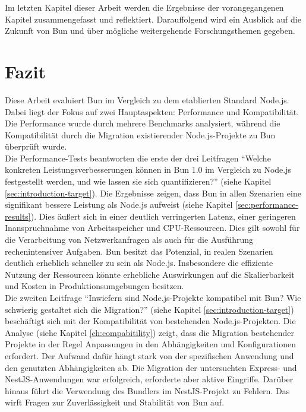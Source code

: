  \label{ch:finalThoughts}
Im letzten Kapitel dieser Arbeit werden die Ergebnisse der vorangegangenen Kapitel zusammengefasst und reflektiert. Darauffolgend wird ein Ausblick auf die Zukunft von Bun und über mögliche weitergehende Forschungsthemen gegeben.

\section{Fazit} \label{sec:finalThoughts-conclusion}
Diese Arbeit evaluiert Bun im Vergleich zu dem etablierten Standard Node.js. Dabei liegt der Fokus auf zwei Hauptaspekten: Performance und Kompatibilität. Die Performance wurde durch mehrere Benchmarks analysiert, während die Kompatibilität durch die Migration existierender Node.js-Projekte zu Bun überprüft wurde.\\

\noindent
Die Performance-Tests beantworten die erste der drei Leitfragen ``Welche konkreten Leistungsverbesserungen können in Bun 1.0 im Vergleich zu Node.js festgestellt werden, und wie lassen sie sich quantifizieren?'' (siehe Kapitel \ref{sec:introduction-target}). Die Ergebnisse zeigen, dass Bun in allen Szenarien eine signifikant bessere Leistung als Node.js aufweist (siehe Kapitel \ref{sec:performance-results}). Dies äußert sich in einer deutlich verringerten Latenz, einer geringeren Inanspruchnahme von Arbeitsspeicher und CPU-Ressourcen. Dies gilt sowohl für die Verarbeitung von Netzwerkanfragen als auch für die Ausführung rechenintensiver Aufgaben. Bun besitzt das Potenzial, in realen Szenarien deutlich erheblich schneller zu sein als Node.js. Insbesondere die effiziente Nutzung der Ressourcen könnte erhebliche Auswirkungen auf die Skalierbarkeit und Kosten in Produktionsumgebungen besitzen.\\

\noindent
Die zweiten Leitfrage  ``Inwiefern sind Node.js-Projekte kompatibel mit Bun? Wie schwierig gestaltet sich die Migration?'' (siehe Kapitel \ref{sec:introduction-target}) beschäftigt sich mit der Kompatibilität von bestehenden Node.js-Projekten. Die Analyse (siehe Kapitel \ref{ch:compabitility}) zeigt, dass die Migration bestehender Projekte in der Regel Anpassungen in den Abhängigkeiten und Konfigurationen erfordert. Der Aufwand dafür hängt stark von der spezifischen Anwendung und den genutzten Abhängigkeiten ab. Die Migration der untersuchten Express- und NestJS-Anwendungen war erfolgreich, erforderte aber aktive Eingriffe. Darüber hinaus führt die Verwendung des Bundlers im NestJS-Projekt zu Fehlern. Das wirft Fragen zur Zuverlässigkeit und Stabilität von Bun auf.\\

